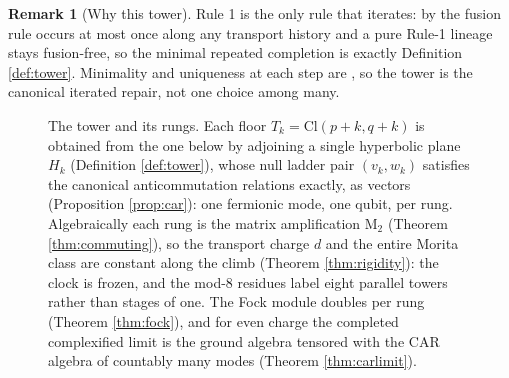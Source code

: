 \documentclass[11pt]{article}
\theoremstyle{definition}
\newtheorem{remark}[theorem]{Remark}
\newcommand{\Cl}{\mathrm{Cl}}
\newcommand{\C}{\mathbb{C}}
\newcommand{\Mat}{\mathrm{M}}
\newcommand{\CAR}{\mathrm{CAR}}
\begin{document}
\begin{remark}[Why this tower]\label{rem:whytower}
Rule 1 is the only rule that iterates: by \cite[Prop.~7.4]{ButlerT1} the fusion rule occurs at most once along any transport history and a pure Rule-1 lineage stays fusion-free, so the minimal repeated completion is exactly Definition \ref{def:tower}. Minimality and uniqueness at each step are \cite[Thm.~4.13]{ButlerT1}, so the tower is the canonical iterated repair, not one choice among many.
\end{remark}

\begin{figure}[t]
\centering
{}
\caption{The tower and its rungs. Each floor $T_k = \Cl(p{+}k, q{+}k)$ is obtained from the one below by adjoining a single hyperbolic plane $H_k$ (Definition \ref{def:tower}), whose null ladder pair $(v_k, w_k)$ satisfies the canonical anticommutation relations exactly, as vectors (Proposition \ref{prop:car}): one fermionic mode, one qubit, per rung. Algebraically each rung is the matrix amplification $\Mat_2$ (Theorem \ref{thm:commuting}), so the transport charge $d$ and the entire Morita class are constant along the climb (Theorem \ref{thm:rigidity}): the clock is frozen, and the mod-8 residues label eight parallel towers rather than stages of one. The Fock module doubles per rung (Theorem \ref{thm:fock}), and for even charge the completed complexified limit is the ground algebra tensored with the CAR algebra of countably many modes (Theorem \ref{thm:carlimit}).}
\label{fig:tower}
\end{figure}
\end{document}
